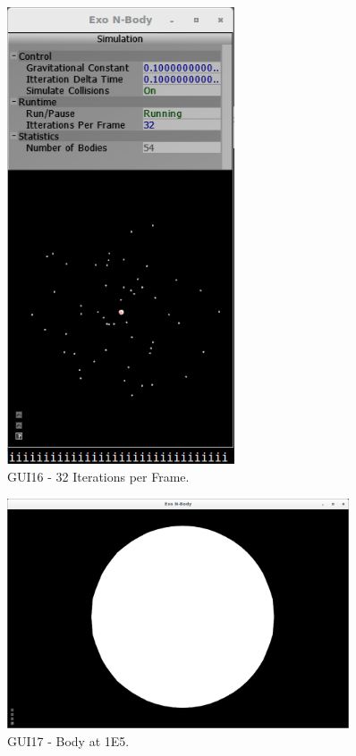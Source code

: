 \pagebreak

\begin{figure}[H]
  \centering
  \includegraphics[width=0.6\textwidth]{img/testingEvidence/gui16_3.png}
  \caption{GUI16 - 32 Iterations per Frame.}
\end{figure}

\pagebreak

\begin{figure}[H]
  \centering
  \includegraphics[width=0.9\textwidth]{img/testingEvidence/gui17_0.png}
  \caption{GUI17 - Body at 1E5.}
\end{figure}

